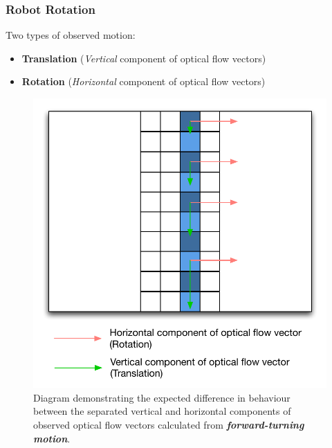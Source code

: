\documentclass[10pt, compress]{beamer}
\begin{document}
\begin{frame}[fragile]
  \frametitle{Robot Rotation}
  
\vspace{-10pt}

Two types of observed motion:

\begin{itemize}[label={\textbullet}]
  	\item \textbf{Translation} (\textit{Vertical} component of optical flow vectors)
  	\item \textbf{Rotation} (\textit{Horizontal} component of optical flow vectors)
  \end{itemize}

  \begin{figure}[ht!]
\centering
\includegraphics[scale=0.3]{rotation_diag}
\caption{Diagram demonstrating the expected difference in behaviour between the separated vertical and horizontal components of observed optical flow vectors calculated from \textbf{\textit{forward-turning motion}}.}
  \end{figure}
  
  
\end{frame}
\end{document}
